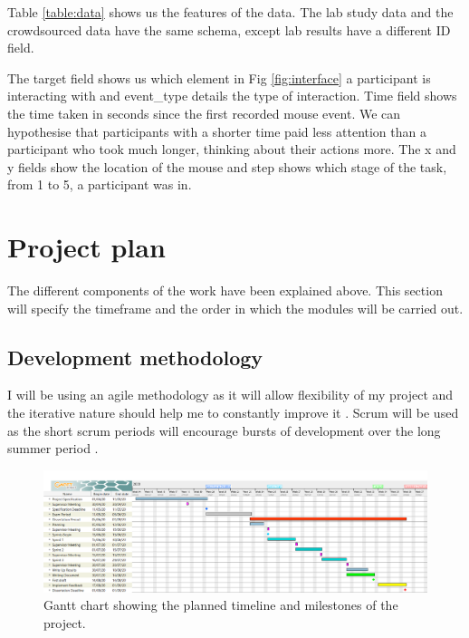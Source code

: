 \documentclass{article}
\begin{document}
Table \ref{table:data} shows us the features of the data.
The lab study data and the crowdsourced data have the same schema, except lab results have a different ID field.

The target field shows us which element in Fig \ref{fig:interface} a participant is interacting with and event\_type details the type of interaction.
Time field shows the time taken in seconds since the first recorded mouse event.
We can hypothesise that participants with a shorter time paid less attention than a participant who took much longer, thinking about their actions more.
The x and y fields show the location of the mouse and step shows which stage of the task, from 1 to 5, a participant was in.


\section{Project plan}
% 

The different components of the work have been explained above.
This section will specify the timeframe and the order in which the modules will be carried out.

\subsection{Development methodology}



I will be using an agile methodology as it will allow flexibility of my project and the iterative nature should help me to constantly improve it \cite{beck2001manifesto}. 
Scrum will be used as the short scrum periods will encourage bursts of development over the long summer period \cite{schwaber1997scrum}.

\begin{figure}[ht]
    \centering
    \centerline{
        \includegraphics[scale=0.32]{GanttChart.PNG}
    }
    \caption{Gantt chart showing the planned timeline and milestones of the project.}
    \label{fig:Gantt}
\end{figure}
\end{document}
